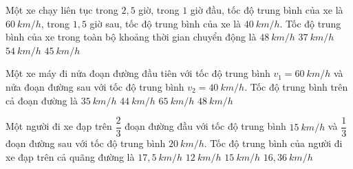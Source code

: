 \begin{ex}%
Một xe chạy liên tục trong $2,5$ giờ, trong $1$ giờ đầu, tốc độ trung bình của xe là $60\ km/h$, trong $1,5$ giờ sau, tốc độ trung bình của xe là $40\ km/h$. Tốc độ trung bình của xe trong toàn bộ khoảng thời gian chuyển động là
\choice
{\True $48\ km/h$}
{$37\ km/h$}
{$54\ km/h$}
{$45\ km/h$}
\loigiai{
}
\end{ex}
\begin{ex}%
Một xe máy đi nửa đoạn đường đầu tiên với tốc độ trung bình $v_1 = 60\ km/h$ và nửa đoạn đường sau với tốc độ trung bình $v_2 = 40\ km/h$. Tốc độ trung bình trên cả đoạn đường là
\choice
{$35\ km/h$}
{$44\ km/h$}
{$65\ km/h$}
{\True $48\ km/h$}

\end{ex}
\begin{ex}%
Một người đi xe đạp trên $\dfrac{2}{3}$ đoạn đường đầu với tốc độ trung bình $15\ km/h$ và $\dfrac{1}{3}$ đoạn đường sau với tốc độ trung bình $20\ km/h$. Tốc độ trung bình của người đi xe đạp trên cả quãng đường là
\choice
{$17,5\ km/h$}
{$12\ km/h$}
{$15\ km/h$}
{\True $16,36\ km/h$}
\end{ex}
